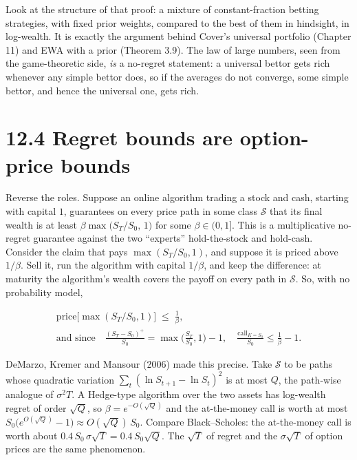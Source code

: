 \documentclass[11pt,a4paper,openany]{book}
\begin{document}
Look at the structure of that proof: a mixture of constant-fraction betting strategies, with fixed prior weights, compared to the best of them in hindsight, in log-wealth. It is exactly the argument behind Cover's universal portfolio (Chapter 11) and EWA with a prior (Theorem 3.9). The law of large numbers, seen from the game-theoretic side, \emph{is} a no-regret statement: a universal bettor gets rich whenever any simple bettor does, so if the averages do not converge, some simple bettor, and hence the universal one, gets rich.

\section*{12.4 Regret bounds are option-price bounds}\label{ch12-options}

Reverse the roles. Suppose an online algorithm trading a stock and cash, starting with capital $1$, guarantees on every price path in some class $\mathcal S$ that its final wealth is at least $\beta\max\big(S_T/S_0,\,1\big)$ for some $\beta\in(0,1]$. This is a multiplicative no-regret guarantee against the two ``experts'' hold-the-stock and hold-cash. Consider the claim that pays $\max(S_T/S_0,1)$, and suppose it is priced above $1/\beta$. Sell it, run the algorithm with capital $1/\beta$, and keep the difference: at maturity the algorithm's wealth covers the payoff on every path in $\mathcal S$. So, with no probability model,

\[\begin{gathered}\text{price}\big[\max(S_T/S_0,1)\big]\;\le\;\frac1\beta,\\
\text{and since}\quad \frac{(S_T-S_0)^+}{S_0}=\max\Big(\frac{S_T}{S_0},1\Big)-1,\quad \frac{\text{call}_{K=S_0}}{S_0}\le\frac1\beta-1.\end{gathered}\]

DeMarzo, Kremer and Mansour (2006) made this precise. Take $\mathcal S$ to be paths whose quadratic variation $\sum_t(\ln S_{t+1}-\ln S_t)^2$ is at most $Q$, the path-wise analogue of $\sigma^2T$. A Hedge-type algorithm over the two assets has log-wealth regret of order $\sqrt Q$, so $\beta=e^{-O(\sqrt Q)}$ and the at-the-money call is worth at most $S_0\big(e^{O(\sqrt Q)}-1\big)\approx O(\sqrt Q)\,S_0$. Compare Black–Scholes: the at-the-money call is worth about $0.4\,S_0\,\sigma\sqrt T=0.4\,S_0\sqrt Q$. The $\sqrt T$ of regret and the $\sigma\sqrt T$ of option prices are the same phenomenon.
\end{document}
